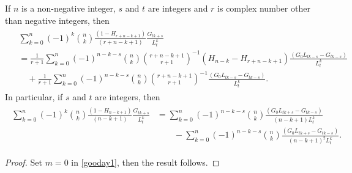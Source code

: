 \documentclass[12pt,reqno]{article}
\begin{document}
\begin{corollary}
If $n$ is a non-negative integer, $s$ and $t$ are integers and $r$ is complex number other than negative integers, then 
\begin{align}\label{go13}
\begin{split}
&\sum_{k=0}^n(-1)^k \binom{n}{k}\frac{\left(1-H_{r+n-k+1}\right)}{(r+n-k+1)}\frac{G_{tk+s}}{L_t^k} \\
&= \frac{1}{r+1}\sum_{k=0}^n (-1)^{n-k-s}\binom{n}{k}\binom{r+n-k+1}{r+1}^{-1}\left(H_{n-k}-H_{r+n-k+1}\right)\frac{\left(G_0L_{tk-s}-G_{tk-s}\right)}{L_t^k}\\
&\quad + \frac{1}{r+1}\sum_{k=0}^n (-1)^{n-k-s}\binom{n}{k}\binom{r+n-k+1}{r+1}^{-1}\frac{\left(G_0L_{tk-s}-G_{tk-s}\right)}{L_t^k}.	
\end{split}	
\end{align}
In particular, if $s$ and $t$ are integers, then
\begin{align}\label{may1}
\begin{split}
\sum_{k=0}^n (-1)^k\binom{n}{k}\frac{(1-H_{n-k+1})}{(n-k+1)}\frac{G_{tk+s}}{L_t^k}
&= \sum_{k = 0}^n(-1)^{n-k-s}\binom{n}{k}\frac{\left(G_0L_{tk+s}-G_{tk-s}\right)}{(n-k+1)L_t^k}\\
&\qquad - \sum_{k = 0}^n(-1)^{n-k-s}\binom{n}{k}\frac{\left(G_0L_{tk+s}-G_{tk-s}\right)}{(n-k+1)^2L_t^k}.
\end{split}
\end{align}
\end{corollary}
\begin{proof}
Set $m=0$ in \eqref{gooday1}, then the result follows.
\end{proof}
\end{document}
